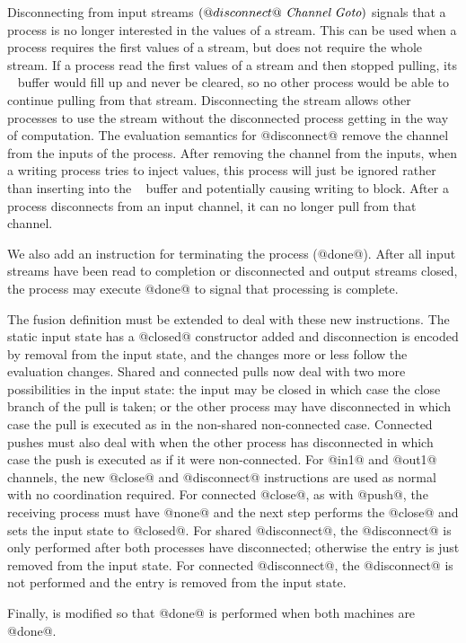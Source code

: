 Disconnecting from input streams $(@disconnect@~\textit{Channel}~\textit{Goto})$ signals that a process is no longer interested in the values of a stream.
This can be used when a process requires the first values of a stream, but does not require the whole stream.
If a process read the first values of a stream and then stopped pulling, its \InputState~ buffer would fill up and never be cleared, so no other process would be able to continue pulling from that stream.
Disconnecting the stream allows other processes to use the stream without the disconnected process getting in the way of computation.
The evaluation semantics for @disconnect@ remove the channel from the inputs of the process.
After removing the channel from the inputs, when a writing process tries to inject values, this process will just be ignored rather than inserting into the \InputState~ buffer and potentially causing writing to block.
After a process disconnects from an input channel, it can no longer pull from that channel.

We also add an instruction for terminating the process (@done@).
After all input streams have been read to completion or disconnected and output streams closed, the process may execute @done@ to signal that processing is complete.

The fusion definition must be extended to deal with these new instructions.
The static input state has a @closed@ constructor added and disconnection is encoded by removal from the input state, and the  changes more or less follow the evaluation changes.
Shared and connected pulls now deal with two more possibilities in the input state: the input may be closed in which case the close branch of the pull is taken; or the other process may have disconnected in which case the pull is executed as in the non-shared non-connected case.
Connected pushes must also deal with when the other process has disconnected in which case the push is executed as if it were non-connected.
For @in1@ and @out1@ channels, the new @close@ and @disconnect@ instructions are used as normal with no coordination required.
For connected @close@, as with @push@, the receiving process must have @none@ and the next step performs the @close@ and sets the input state to @closed@.
For shared @disconnect@, the @disconnect@ is only performed after both processes have disconnected; otherwise the entry is just removed from the input state.
For connected @disconnect@, the @disconnect@ is not performed and the entry is removed from the input state.

Finally,  is modified so that @done@ is performed when both machines are @done@.


